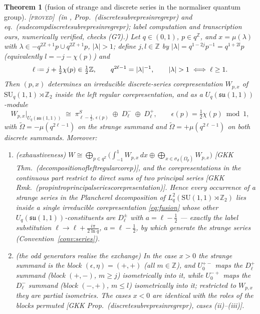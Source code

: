 \documentclass[11pt,a4paper]{article}
\providecommand{\coloneqq}{\mathrel{\vcenter{\baselineskip0.5ex \lineskiplimit0pt
      \hbox{\scriptsize.}\hbox{\scriptsize.}}}=}
\newcommand{\PROVED}{{\color{ForestGreen}\textsc{[proved]}}}
\theoremstyle{definition}
\theoremstyle{plain}
\newtheorem{theorem}[definition]{Theorem}
\newcommand{\Uq}{U_q(\mathfrak{su}(1,1))}
\newcommand{\SUq}{\mathrm{SU}_q(1,1)}
\newcommand{\tCas}{\tilde\Omega}                %
\newcommand{\Z}{\mathbb{Z}}
\begin{document}
\begin{theorem}[fusion of strange and discrete series in the normaliser quantum group]
\label{thm:fusion}
\PROVED\ (in \cite{Groenevelt:2009gkk}, Prop.\ (discretesubrepresinregrepr) and eq.\
(sudecompdiscretesubrepresinregrepr); label computation and transcription ours, numerically
verified, checks (G7).) Let $q\in(0,1)$, $p\in q^{\Z}$, and $x=\mu(\lambda)$ with
$\lambda\in-q^{2\Z+1}p\cup q^{2\Z+1}p$, $|\lambda|>1$; define $j,l\in\Z$ by
$|\lambda|=q^{1-2j}p^{-1}=q^{1+2l}p$ (equivalently $l=-j-\chi(p)$) and
\begin{equation}\label{eq:fusionlabel}
  \ell\coloneqq j+\tfrac12\chi(p)\in\tfrac12\Z,\qquad
  q^{2\ell-1}=|\lambda|^{-1},\qquad |\lambda|>1\iff\ell\ge1 .
\end{equation}
Then $(p,x)$ determines an irreducible discrete-series corepresentation $W_{p,x}$ of
$\SUq\rtimes\Z_2$ inside the left regular corepresentation, and as a $\Uq$-module
\begin{equation}\label{eq:fusion}
  W_{p,x}\big|_{\Uq}\;\cong\;\pi^{S}_{\ell-\frac12,\,\epsilon(p)}\;\oplus\;D^{-}_{\ell}
  \;\oplus\;D^{+}_{\ell},
  \qquad \epsilon(p)=\tfrac12\chi(p)\bmod 1,
\end{equation}
with $\tCas=-\mu(q^{2\ell-1})$ on the strange summand and $\tCas=+\mu(q^{2\ell-1})$ on both
discrete summands. Moreover:
\begin{enumerate}[label=(\alph*)]
\item \emph{(exhaustiveness)} $W\cong\bigoplus_{p\in q^{\Z}}\bigl(\int_{-1}^{1}W_{p,x}\,dx
\oplus\bigoplus_{x\in\sigma_{d}(\Omega_{p})}W_{p,x}\bigr)$ [GKK Thm.\
(decompositionofleftregularcorep)], and the corepresentations in the continuous part
restrict to direct sums of two principal series [GKK Rmk.\
(propintroprincipalseriescorepresentation)]. Hence \emph{every} occurrence of a strange
series in the Plancherel decomposition of $L^{2}_{q}(\mathrm{SU}(1,1)\rtimes\Z_2)$ lies
inside a single irreducible corepresentation \eqref{eq:fusion} whose other
$\Uq$-constituents are $D^{\pm}_{\ell}$ with $a=\ell-\tfrac12$ --- \emph{exactly} the label
substitution $\ell\to\ell+\tfrac{i\pi}{2\ln q}$, $a=\ell-\tfrac12$, by which
\cite{Schouten:2025dssyk} generate the strange series (Convention~\ref{conv:series}).
\item \emph{(the odd generators realise the exchange)} In the case $x>0$ the strange
summand is the block $(\epsilon,\eta)=(+,+)$ (all $m\in\Z$), and $U^{+-}_{0}$ maps the
$D^{+}_{\ell}$ summand (block $(+,-)$, $m\ge j$) isometrically into it, while $U^{-+}_{0}$
maps the $D^{-}_{\ell}$ summand (block $(-,+)$, $m\le l$) isometrically into it; restricted
to $W_{p,x}$ they are partial isometries. The cases $x<0$ are identical with the roles of
the blocks permuted [GKK Prop.\ (discretesubrepresinregrepr), cases (ii)--(iii)].
\end{enumerate}
\end{theorem}
\end{document}

